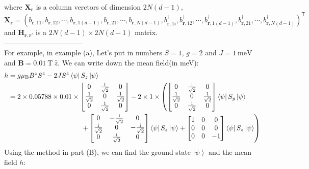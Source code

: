 \documentclass[letter]{article}
\newcommand{\ii}{\mathrm{i}}
\begin{document}
 where $\mathbf{X}_{\bm{r}}$ is a column verctors of dimension $2N(d-1)$, $$\mathbf{X}_{\bm{r}}=\left(b_{\bm{r},11},b_{\bm{r},12},\cdots,b_{\bm{r},1(d-1)},b_{\bm{r},21},\cdots,b_{\bm{r},N(d-1)},b_{\bm{r},1i}^{\dagger},b_{\bm{r},12}^{\dagger},\cdots,b_{\bm{r},1(d-1)}^{\dagger},b_{\bm{r},21}^{\dagger},\cdots,b_{\bm{r},N(d-1)}^{\dagger}\right)^{\mathsf{T}}$$
and $\mathbf{H}_{\bm{r},\bm{r}'}$ is a $2N(d-1)\times 2N(d-1)$ matrix.\\
---------------------------------\\
 For example, in example (a), Let's put in numbers $S=1$, $g=2$ and $J=\SI{1}{\milli\electronvolt}$
and $\bm{B}=\SI{0.01}{\tesla}\ \hat{z}.$ We can write down the mean field(in meV):
$$\begin{aligned}
    h&=  g\mu_{\mathrm{B}} B^z S^z-2J S^z \left<\psi\right|S_z\left|\psi\right>\\
    & = 2\times 0.05788\times 0.01\times  \begin{bmatrix}
        0 & \frac{1}{\sqrt{2}} & 0\\
        \frac{1}{\sqrt{2}} &  0 & \frac{1}{\sqrt{2}}\\
        0& \frac{1}{\sqrt{2}}& 0
        \end{bmatrix}-2\times1\times\left( \begin{bmatrix}
            0 & \frac{1}{\sqrt{2}} & 0\\
            \frac{1}{\sqrt{2}} &  0 &\frac{1}{\sqrt{2}}\\
        0& \frac{1}{\sqrt{2}}& 0
            \end{bmatrix} \left<\psi\right|S_y\left|\psi\right>\right.\\
           & {\ \ \ \ \ \ \ \ \ \ \ \ \ \ }\indent \indent\indent\indent\left.+\begin{bmatrix}
                0& -\frac{\ii}{\sqrt{2}} & 0\\
                \frac{\ii}{\sqrt{2}} &  0 & -\frac{\ii}{\sqrt{2}}\\
            0& \frac{\ii}{\sqrt{2}}&0
                \end{bmatrix} \left<\psi\right|S_z\left|\psi\right>+\begin{bmatrix}
            1 & 0 & 0\\
        0 &  0 & 0\\
        0& 0&-1
            \end{bmatrix} \left<\psi\right|S_z\left|\psi\right>\right)
\end{aligned}$$
Using the method in part (B), we can find the ground state $\left|\psi\right>$ and the mean field $h$:
\end{document}
